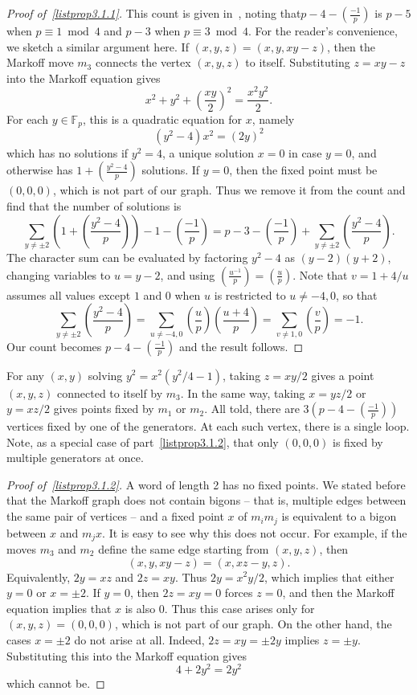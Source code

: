 \documentclass[AHL, Unicode, longabstracts, published]{cedram}
\newcommand{\F}{\mathbb{F}}
\newcommand{\legendre}[2]{\genfrac{(}{)}{}{}{#1}{#2}}
\begin{document}
\goodbreak
\begin{proof}[{Proof of~\eqref{listprop3.1.1}}]
This count is given in~\cite[Lemma~2.3]{CGMP}, noting that\linebreak$p-4 - (\tfrac{-1}{p})$ is $p-5$ when $p\equiv1\bmod4$ and $p-3$ when $p\equiv3\bmod4$. For the reader's convenience, we sketch a similar argument here. If $(x,y,z) = (x,y,xy-z)$, then the Markoff move $m_3$ connects the vertex $(x,y,z)$ to itself. Substituting $z = xy-z$ into the Markoff equation gives
\[
x^2 + y^2 + \left(\frac{xy}{2} \right)^2 = \frac{x^2y^2}{2}.
\]
For each $y \in \F_p$, this is a quadratic equation for $x$, namely
\[
(y^2 - 4)x^2 = (2y)^2
\]
which has no solutions if $y^2 = 4$, a unique solution $x=0$ in case $y=0$, and otherwise has $1 + (\tfrac{y^2-4}{p})$ solutions. If $y = 0$, then the fixed point must be $(0,0,0)$, which is not part of our graph. Thus we remove it from the count and find that the number of solutions is
\[
\sum_{y \neq \pm 2} \left(1 + \legendre{y^2-4}{p} \right) - 1 - \legendre{-1}{p} = p-3 - \legendre{-1}{p} + \sum_{y \neq \pm 2} \legendre{y^2-4}{p}.
\]
The character sum can be evaluated by factoring $y^2-4$ as $(y-2)(y+2)$, changing variables to $u = y-2$, and using $(\tfrac{u^{-1}}{p}) = (\tfrac{u}{p})$. Note that $v = 1 + 4/u$ assumes all values except $1$ and $0$ when $u$ is restricted to $u \neq -4,0$, so that
\[
\sum_{y \neq \pm 2 } \legendre{y^2-4}{p} = \sum_{u \neq -4,0} \legendre{u}{p} \legendre{u+4}{p} = \sum_{v \neq 1,0} \legendre{v}{p} = -1.
\]
Our count becomes $p-4 - (\tfrac{-1}{p})$ and the result follows.
\end{proof}

For any $(x,y)$ solving $y^2 = x^2(y^2/4-1)$, taking $z = xy/2$ gives a point $(x,y,z)$ connected to itself by $m_3$. In the same way, taking $x = yz/2$ or $y=xz/2$ gives points fixed by $m_1$ or $m_2$. All told, there are $3(p-4-(\tfrac{-1}{p}))$ vertices fixed by one of the generators. At each such vertex, there is a single loop. Note, as a special case of part~\eqref{listprop3.1.2}, that only $(0,0,0)$ is fixed by multiple generators at once.

\begin{proof}[{Proof of~\eqref{listprop3.1.2}}]
A word of length 2 has no fixed points. We stated before that the Markoff graph does not contain bigons -- that is, multiple edges between the same pair of vertices -- and a fixed point $x$ of $m_i m_j$ is equivalent to a bigon between $x$ and $m_j x$. It is easy to see why this does not occur. For example, if the moves $m_3$ and $m_2$ define the same edge starting from $(x,y,z)$, then
\[
(x,y,xy-z) = (x, xz-y, z).
\]
Equivalently, $2y = xz$ and $2z = xy$. Thus $2y = x^2y/2$, which implies that either $y=0$ or $x = \pm 2$. If $y=0$, then $2z = xy = 0$ forces $z=0$, and then the Markoff equation implies that $x$ is also 0. Thus this case arises only for $(x,y,z) = (0,0,0)$, which is not part of our graph. On the other hand, the cases $x = \pm 2$ do not arise at all. Indeed, $2z = xy = \pm 2y$ implies $z = \pm y$. Substituting this into the Markoff equation gives
\[
4 + 2y^2 = 2y^2
\]
which cannot be. 
\end{proof}
\end{document}
